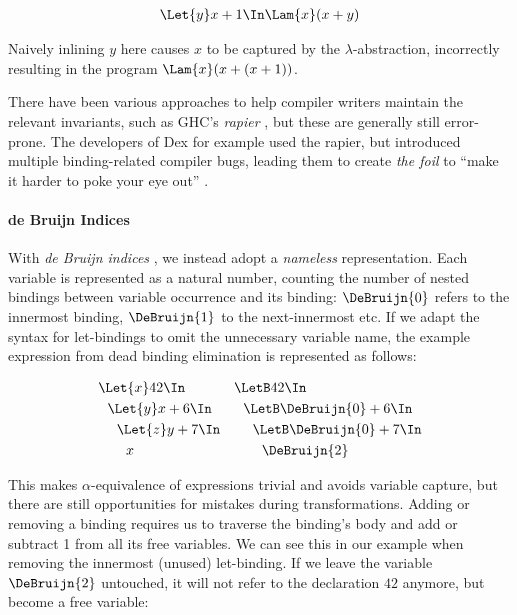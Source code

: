     \begin{align*}
      \Let{y} x + 1 \In \Lam{x} (x + y)
    \end{align*}

    Naively inlining $y$ here causes $x$ to be captured
    by the $\lambda$-abstraction, incorrectly resulting in the program
    $\Lam{x} (x + (x + 1))$.

    There have been various approaches to help compiler writers
    maintain the relevant invariants,
    such as GHC's \emph{rapier} \cite{Jones2002GHCInliner},
    but these are generally still error-prone.
    The developers of Dex for example used the rapier,
    but introduced multiple binding-related compiler bugs,
    leading them to create \emph{the foil}
    to ``make it harder to poke your eye out''
    \cite{Maclaurin2022Foil}.

  \paragraph{de Bruijn Indices}
    With \emph{de Bruijn indices}
    \cite{DeBruijn1972NamelessIndices},
    we instead adopt a \emph{nameless} representation.
    Each variable is represented as a natural number,
    counting the number of nested bindings between variable occurrence and its binding:
    $\DeBruijn{0}$ refers to the innermost binding, $\DeBruijn{1}$ to the next-innermost etc.
    If we adapt the syntax for let-bindings to omit the unnecessary variable name,
    the example expression from dead binding elimination is represented as follows:

    \begin{align*}
      &\Let{x} 42 \In            & &\LetB 42 \In                       \\
      &\ \ \Let{y} x + 6 \In     & &\ \ \LetB \DeBruijn{0} + 6 \In     \\
      &\ \ \ \ \Let{z} y + 7 \In & &\ \ \ \ \LetB \DeBruijn{0} + 7 \In \\
      &\ \ \ \ \ \ x             & &\ \ \ \ \ \ \DeBruijn{2}
    \end{align*}

    This makes $\alpha$-equivalence of expressions trivial and avoids variable capture,
    but there are still opportunities for mistakes during transformations.
    Adding or removing a binding
    requires us to traverse the binding's body and add or subtract 1 from all its free variables.
    We can see this in our example when removing the innermost (unused) let-binding.
    If we leave the variable $\DeBruijn{2}$ untouched,
    it will not refer to the declaration $42$ anymore,
    but become a free variable:

